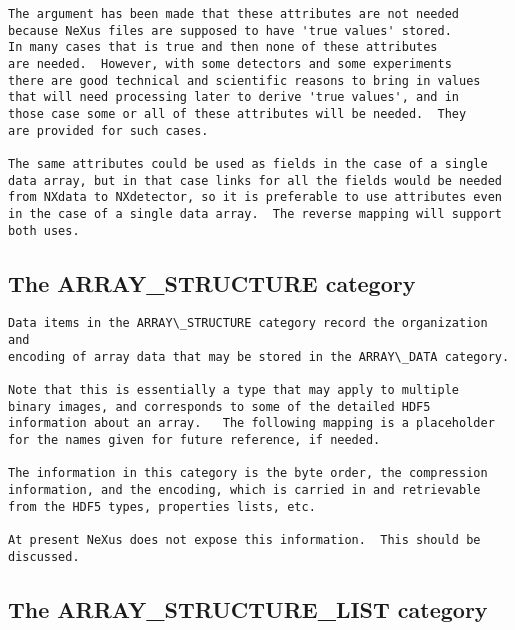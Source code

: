 \documentclass[11pt]{article}
\begin{document}
{\begin{verbatim}
The argument has been made that these attributes are not needed
because NeXus files are supposed to have 'true values' stored.
In many cases that is true and then none of these attributes
are needed.  However, with some detectors and some experiments
there are good technical and scientific reasons to bring in values
that will need processing later to derive 'true values', and in
those case some or all of these attributes will be needed.  They
are provided for such cases.

The same attributes could be used as fields in the case of a single
data array, but in that case links for all the fields would be needed
from NXdata to NXdetector, so it is preferable to use attributes even
in the case of a single data array.  The reverse mapping will support
both uses.
\end{verbatim}
}


\subsection{The ARRAY\_STRUCTURE category}

{\footnotesize\begin{verbatim}
Data items in the ARRAY\_STRUCTURE category record the organization and
encoding of array data that may be stored in the ARRAY\_DATA category.

Note that this is essentially a type that may apply to multiple
binary images, and corresponds to some of the detailed HDF5
information about an array.   The following mapping is a placeholder
for the names given for future reference, if needed.

The information in this category is the byte order, the compression
information, and the encoding, which is carried in and retrievable
from the HDF5 types, properties lists, etc.  

At present NeXus does not expose this information.  This should be
discussed.
\end{verbatim}
}



\subsection{The ARRAY\_STRUCTURE\_LIST category}
\end{document}
